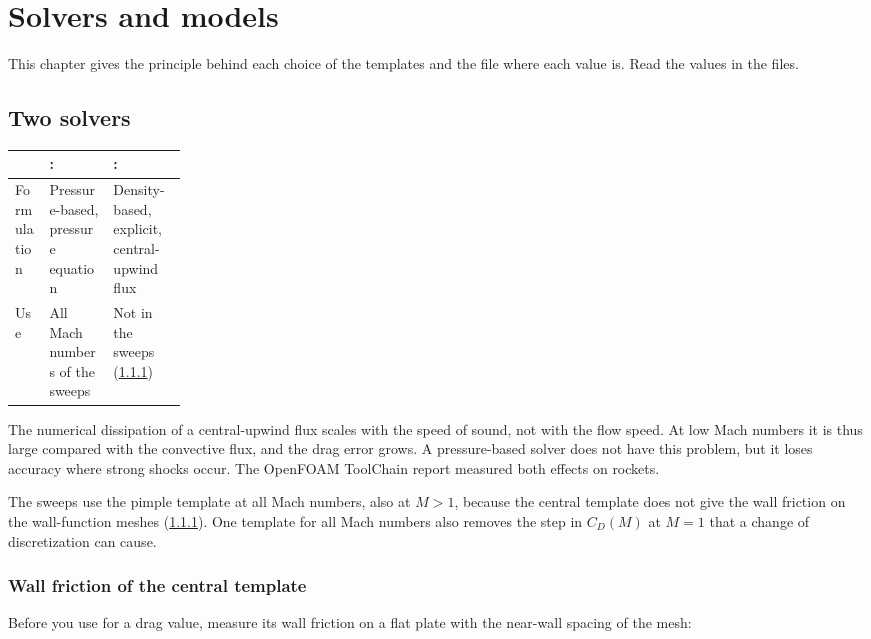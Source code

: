 \chapter{Solvers and models}\label{ch:solvers}

This chapter gives the principle behind each choice of the templates and the file
where each value is. Read the values in the files.

\section{Two solvers}\label{sec:two-solvers}

\begin{tabularx}{\linewidth}{@{}P{0.20\linewidth} L L@{}}
\toprule
 & :  & :  \\
\midrule
Formulation & Pressure-based,  pressure equation & Density-based, explicit, central-upwind flux \\
Use & All Mach numbers of the sweeps & Not in the sweeps (\cref{sec:central-friction}) \\
\bottomrule
\end{tabularx}

\medskip
The numerical dissipation of a central-upwind flux scales with the speed of sound, not
with the flow speed. At low Mach numbers it is thus large compared with the convective
flux, and the drag error grows. A pressure-based solver does not have this problem, but
it loses accuracy where strong shocks occur. The OpenFOAM ToolChain report
\citep[§6]{toolchain2026} measured both effects on rockets.

The sweeps use the pimple template at all Mach numbers, also at $M > 1$, because the
central template does not give the wall friction on the wall-function meshes
(\cref{sec:central-friction}). One template for all Mach numbers also removes the step
in $C_D(M)$ at $M = 1$ that a change of discretization can cause.

\subsection{Wall friction of the central template}\label{sec:central-friction}

Before you use  for a drag value, measure its wall friction on a
flat plate with the near-wall spacing of the mesh:

